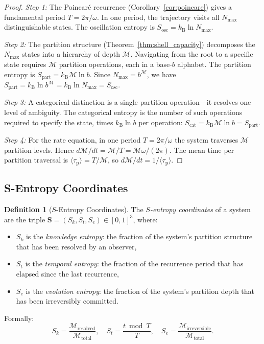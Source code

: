 \documentclass[11pt,twocolumn,a4paper]{article}
\theoremstyle{plain}
\theoremstyle{definition}
\newtheorem{definition}[theorem]{Definition}
\theoremstyle{remark}
\newcommand{\Sk}{S_k}
\newcommand{\St}{S_t}
\newcommand{\Se}{S_e}
\newcommand{\Sosc}{S_{\mathrm{osc}}}
\newcommand{\Scat}{S_{\mathrm{cat}}}
\newcommand{\Spart}{S_{\mathrm{part}}}
\newcommand{\kB}{k_{\mathrm{B}}}
\newcommand{\Nmax}{N_{\mathrm{max}}}
\newcommand{\Depth}{\mathcal{M}}
\newcommand{\taup}{\tau_{\mathrm{p}}}
\begin{document}
\begin{proof}
\emph{Step 1:} The Poincar\'e recurrence (Corollary~\ref{cor:poincare}) gives a fundamental period $T = 2\pi/\omega$. In one period, the trajectory visits all $\Nmax$ distinguishable states. The oscillation entropy is $\Sosc = \kB \ln \Nmax$.

\emph{Step 2:} The partition structure (Theorem~\ref{thm:shell_capacity}) decomposes the $\Nmax$ states into a hierarchy of depth $\Depth$. Navigating from the root to a specific state requires $\Depth$ partition operations, each in a base-$b$ alphabet. The partition entropy is $\Spart = \kB \Depth \ln b$. Since $\Nmax = b^\Depth$, we have $\Spart = \kB \ln b^\Depth = \kB \ln \Nmax = \Sosc$.

\emph{Step 3:} A categorical distinction is a single partition operation---it resolves one level of ambiguity. The categorical entropy is the number of such operations required to specify the state, times $\kB \ln b$ per operation: $\Scat = \kB \Depth \ln b = \Spart$.

\emph{Step 4:} For the rate equation, in one period $T = 2\pi/\omega$ the system traverses $\Depth$ partition levels. Hence $d\Depth/dt = \Depth/T = \Depth \omega/(2\pi)$. The mean time per partition traversal is $\langle \taup \rangle = T/\Depth$, so $d\Depth/dt = 1/\langle \taup \rangle$.
\end{proof}

\subsection{S-Entropy Coordinates}

\begin{definition}[$S$-Entropy Coordinates]
\label{def:sentropy}
The \emph{$S$-entropy coordinates} of a system are the triple $\mathbf{S} = (\Sk, \St, \Se) \in [0,1]^3$, where:
\begin{itemize}[nosep]
    \item $\Sk$ is the \emph{knowledge entropy}: the fraction of the system's partition structure that has been resolved by an observer,
    \item $\St$ is the \emph{temporal entropy}: the fraction of the recurrence period that has elapsed since the last recurrence,
    \item $\Se$ is the \emph{evolution entropy}: the fraction of the system's partition depth that has been irreversibly committed.
\end{itemize}
Formally:
\begin{equation}
\Sk = \frac{\Depth_{\mathrm{resolved}}}{\Depth_{\mathrm{total}}}, \quad
\St = \frac{t \bmod T}{T}, \quad
\Se = \frac{\Depth_{\mathrm{irreversible}}}{\Depth_{\mathrm{total}}}.
\label{eq:sentropy}
\end{equation}
\end{definition}
\end{document}
